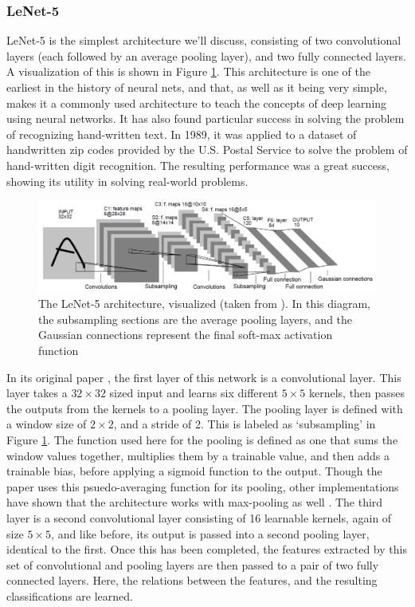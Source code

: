 \documentclass[11pt,a4paper,oldfontcommands]{memoir}
\begin{document}
\subsubsection{LeNet-5}
\label{sss:lenet5}
LeNet-5 is the simplest architecture we'll discuss, consisting of two convolutional layers (each followed by an average pooling layer), and two fully connected layers. A visualization of this is shown in Figure \ref{fig:lenet_architecture}. This architecture is one of the earliest in the history of neural nets, and that, as well as it being very simple, makes it a commonly used architecture to teach the concepts of deep learning using neural networks. It has also found particular success in solving the problem of recognizing hand-written text. In 1989, it was applied to a dataset of handwritten zip codes provided by the U.S. Postal Service to solve the problem of hand-written digit recognition. The resulting performance was a great success, showing its utility in solving real-world problems\cite{lenet_postal_service}.   

\begin{figure}
    \centering
    \includegraphics[width=45em]{Images/lenet_architecture.PNG}
    \caption{The LeNet-5 architecture, visualized (taken from \cite{lenet5}). In this diagram, the subsampling sections are the average pooling layers, and the Gaussian connections represent the final soft-max activation function}
    \label{fig:lenet_architecture}
\end{figure}

In its original paper \cite{lenet5}, the first layer of this network is a convolutional layer. This layer takes a $32 \times 32$ sized input and learns six different $5 \times 5$ kernels, then passes the outputs from the kernels to a pooling layer. The pooling layer is defined with a window size of $2 \times 2$, and a stride of 2. This is labeled as `subsampling' in Figure \ref{fig:lenet_architecture}. The function used here for the pooling is defined as one that sums the window values together, multiplies them by a trainable value, and then adds a trainable bias, before applying a sigmoid function to the output. Though the paper \cite{lenet5} uses this psuedo-averaging function for its pooling, other implementations have shown that the architecture works with max-pooling as well \cite{ternary}. The third layer is a second convolutional layer consisting of 16 learnable kernels, again of size $5 \times 5$, and like before, its output is passed into a second pooling layer, identical to the first. Once this has been completed, the features extracted by this set of convolutional and pooling layers are then passed to a pair of two fully connected layers. Here, the relations between the features, and the resulting classifications are learned. 
\end{document}
